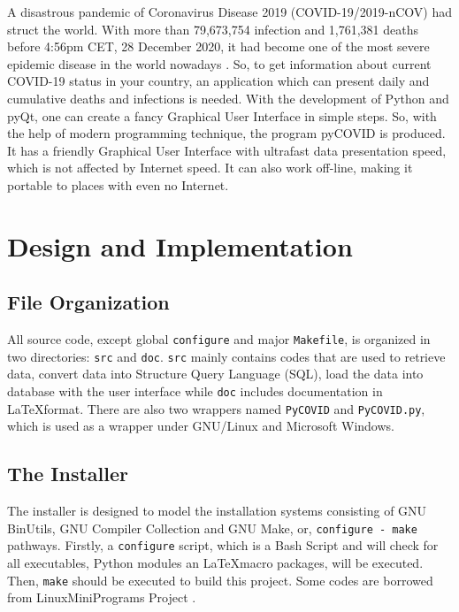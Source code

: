 \documentclass[]{ylarticle}
\begin{document}
\sloppy{}\maketitle\flushbottom\tableofcontents\setlength{\parskip}{1em}
\Introduction
A disastrous pandemic of Coronavirus Disease 2019 (COVID-19/2019-nCOV) had struct the world. With more than 79,673,754 infection and 1,761,381 deaths before 4:56pm CET, 28 December 2020, it had become one of the most severe epidemic disease in the world nowadays \cite{WHOData}. So, to get information about current COVID-19 status in your country, an application which can present daily and cumulative deaths and infections is needed. With the development of Python and pyQt, one can create a fancy Graphical User Interface in simple steps. So, with the help of modern programming technique, the program pyCOVID is produced. It has a friendly Graphical User Interface with ultrafast data presentation speed, which is not affected by Internet speed. It can also work off-line, making it portable to places with even no Internet.

\section{Design and Implementation}

\subsection{File Organization}
All source code, except global \verb|configure| and major \verb|Makefile|, is organized in two directories: \verb|src| and \verb|doc|. \verb|src| mainly contains codes that are used to retrieve data, convert data into Structure Query Language (SQL), load the data into database with the user interface while \verb|doc| includes documentation in \LaTeX format. There are also two wrappers named \verb|PyCOVID| and \verb|PyCOVID.py|, which is used as a wrapper under GNU/Linux and Microsoft Windows.

\subsection{The Installer}

The installer is designed to model the installation systems consisting of GNU BinUtils, GNU Compiler Collection and GNU Make, or, \verb|configure - make| pathways. Firstly, a \verb|configure| script, which is a Bash Script and will check for all executables, Python modules an \LaTeX macro packages, will be executed. Then, \verb|make| should be executed to build this project. Some codes are borrowed from LinuxMiniPrograms Project \cite{LinuxMiniPrograms}.
\end{document}
